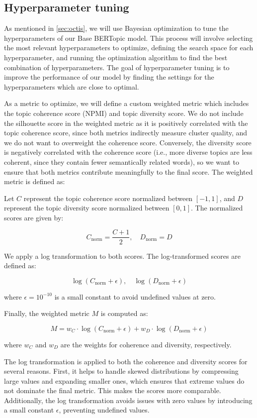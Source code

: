 \subsection{Hyperparameter tuning}
\label{sec:hyperparameter_tuning}
As mentioned in \cref{sec:octis}, we will use Bayesian optimization to tune the hyperparameters of our Base BERTopic model. This process will involve selecting the most relevant hyperparameters to optimize, defining the search space for each hyperparameter, and running the optimization algorithm to find the best combination of hyperparameters. The goal of hyperparameter tuning is to improve the performance of our model by finding the settings for the hyperparameters which are close to optimal.

As a metric to optimize, we will define a custom weighted metric which includes the topic coherence score (NPMI) and topic diversity score. We do not include the silhouette score in the weighted metric as it is positively correlated with the topic coherence score, since both metrics indirectly measure cluster quality, and we do not want to overweight the coherence score. Conversely, the diversity score is negatively correlated with the coherence score (i.e., more diverse topics are less coherent, since they contain fewer semantically related words), so we want to ensure that both metrics contribute meaningfully to the final score. The weighted metric is defined as:

Let \( C \) represent the topic coherence score normalized between \([-1, 1]\), and \( D \) represent the topic diversity score normalized between \([0, 1]\). The normalized scores are given by:

\[
C_{\text{norm}} = \frac{C + 1}{2}, \quad D_{\text{norm}} = D
\]

We apply a log transformation to both scores. The log-transformed scores are defined as:

\[
\log(C_{\text{norm}} + \epsilon), \quad \log(D_{\text{norm}} + \epsilon)
\]

where \( \epsilon = 10^{-10} \) is a small constant to avoid undefined values at zero.

Finally, the weighted metric \( M \) is computed as:

\[
M = w_C \cdot \log(C_{\text{norm}} + \epsilon) + w_D \cdot \log(D_{\text{norm}} + \epsilon)
\]

where \( w_C \) and \( w_D \) are the weights for coherence and diversity, respectively.

The log transformation is applied to both the coherence and diversity scores for several reasons. First, it helps to handle skewed distributions by compressing large values and expanding smaller ones, which ensures that extreme values do not dominate the final metric. This makes the scores more comparable. Additionally, the log transformation avoids issues with zero values by introducing a small constant \( \epsilon \), preventing undefined values.

